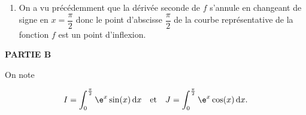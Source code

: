 \begin{enumerate}
\begin{enumerate}
Pour tout réel $x$ de l'intervalle $\left[0~;\pi\right]$ :

$\begin{aligned}
f''(x) & = \e^x \left( \sin(x) +\cos(x)\right)  + \e^x\left( \cos(x) -\sin(x)\right)\\
	& = \e^x \left( \sin(x) +\cos(x) +\cos(x) -\sin(x)\right)\\
	&= 2 \e^x \cos(x)
\end{aligned}$.

On a le tableau de signes suivant :

\hfill~\hfill~

donc pour tout réel $x$ de l'intervalle $\left[0~;~\dfrac{\pi}{2}\right]$, $f''(x)>0$

d'où la fonction $f$ est convexe sur l'intervalle  $\left[0~;~\dfrac{\pi}{2}\right]$.
		\item La courbe représentative d'une fonction convexe est au-dessus de toutes ses tangentes, en particulier ici, la courbe $\mathcal{C}_f$  est au-dessus de la tangente à la courbe $\mathcal{C}_f$ au point d'abscisse 0, d'équation $y = x$ (d'après la question précédente).

On a donc, pour tout réel $x$ de l'intervalle $\left[0~;~\dfrac{\pi}{2}\right]$,\quad $\e^x \sin (x) \geqslant x$.
	\end{enumerate}
\item On a vu précédemment que la dérivée seconde de $f$ s'annule en changeant de signe en $x=\dfrac{\pi}{2}$ donc le point d'abscisse $\dfrac{\pi}{2}$ de la courbe représentative de la fonction $f$ est un point d'inflexion.
\end{enumerate}

\bigskip

\textbf{PARTIE B}

\medskip


On note

\[I = \displaystyle\int_0^{\frac{\pi}{2}} \e^x \sin (x)\, \text{d}x\quad  \text{et}\quad J = \displaystyle\int_0^{\frac{\pi}{2}} \e^x \cos (x)\, \text{d}x.\]

\smallskip

